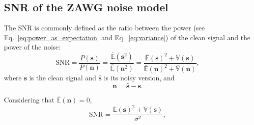 \begin{comment}
If $\mathbf{s}=\mathbf{0}$ (a constant signal
with zeros), Equations \ref{eq:E_ZAWG} and \ref{eq:V_ZAWG}
reduce to
\begin{equation}
  \mathbb{E}(\mathbf{\hat{\mathbf{s}}}) = 0,
\end{equation}
and
\begin{equation}
  \mathbb{V}(\hat{\mathbf{s}}) = \sigma^2,
\end{equation}
respectively, and if $\mathbf{s}=\mathbf{1}$ (a constant signal with
ones)
\begin{equation}
  \mathbb{E}(\hat{\mathbf{s}}) = \mathbb{E}(\mathbf{1}) = 1,
\end{equation}
and
\begin{equation}
  \mathbb{V}(\hat{\mathbf{s}}) = \sigma^2.
\end{equation}
\end{comment}

\subsection{SNR of the ZAWG noise model}

The \gls{SNR} is commonly defined as the ratio between the power (see
Eq.~\ref{eq:power_as_expectation} and Eq.~\ref{eq:variance}) of the
clean signal and the power of the noise:
\begin{equation}
  \text{SNR} = \frac{P(\mathbf{s})}{P(\mathbf{n})} = \frac{\overline{\mathbb{E}}(\mathbf{s}^2)}{\overline{\mathbb{E}}(\mathbf{n}^2)} = \frac{\overline{\mathbb{E}}(\mathbf{s})^2+\overline{\mathbb{V}}(\mathbf{s})}{\overline{\mathbb{E}}(\mathbf{n})^2+\overline{\mathbb{V}}(\mathbf{n})},
  \label{eq:SNR}
\end{equation}
where $\mathbf{s}$ is the clean signal and $\hat{\mathbf{s}}$ is its
noisy version, and
\begin{equation}
  \mathbf{n} = \hat{\mathbf{s}} - \mathbf{s}.
\end{equation}

Considering that $\overline{\mathbb{E}}(\mathbf{n}) = 0$,
\begin{equation}
  \text{SNR} = \frac{\overline{\mathbb{E}}(\mathbf{s})^2 + \overline{\mathbb{V}}(\mathbf{s})}{\sigma^2},
\end{equation}

